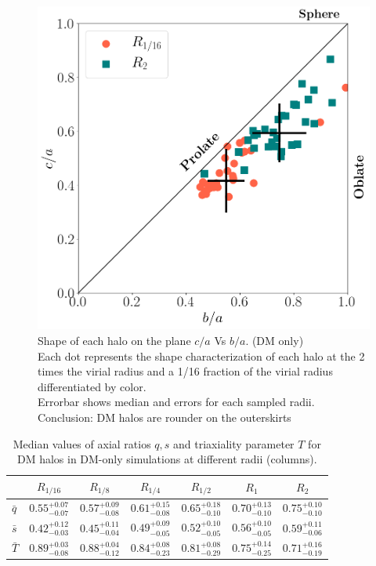 \documentclass[a4paper,fleqn,usenatbib]{mnras}
\begin{document}
 
\begin{figure}
  \centering
 \includegraphics[width=0.9\columnwidth]{./pics/Triaxial_Plane/Triax_DM.png}
  
  \hfill
  \caption{Shape of each halo on the plane $c/a$ Vs $b/a$. (DM only)\\
   Each dot represents the shape characterization of each halo at the 2 times the virial radius and a  1/16 fraction of the virial radius differentiated by color.\\   
  Errorbar shows median and errors for each sampled radii.\\
  Conclusion: DM halos are rounder on the outerskirts }
  \label{fig:Triax_DM}
\end{figure}

\begin{table}
\setlength{\tabcolsep}{3pt}
\begin{tabular}{l|cccccc}
 &$R_{1/16}$& $R_{1/8}$& $R_{1/4}$& $R_{1/2}$& $R_1$ & $R_2$\\
\hline \hline
$\bar{q}$&$0.55^{+0.07}_{-0.07}$&$0.57^{+0.09}_{-0.08}$&$0.61^{+0.15}_{-0.08}$&$0.65^{+0.18}_{-0.10}$&$0.70^{+0.13}_{-0.10}$&$0.75^{+0.10}_{-0.10}$ \\ [0.1cm]
$\bar{s}$&$0.42^{+0.12}_{-0.03}$&$0.45^{+0.11}_{-0.04}$&$0.49^{+0.09}_{-0.05}$&$0.52^{+0.10}_{-0.05}$&$0.56^{+0.10}_{-0.05}$&$0.59^{+0.11}_{-0.06}$ \\ [0.1cm]
$\bar{T}$&$0.89^{+0.03}_{-0.08}$&$0.88^{+0.04}_{-0.12}$&$0.84^{+0.08}_{-0.23}$&$0.81^{+0.08}_{-0.29}$&$0.75^{+0.14}_{-0.25}$&$0.71^{+0.16}_{-0.19}$ \\ [0.1cm]

\hline
\end{tabular}
\caption{Median values of axial ratios $q,s$ and triaxiality parameter $T$ for DM halos in DM-only simulations at different radii (columns). }
\label{tabe:DM table}
\end{table}
\end{document}
